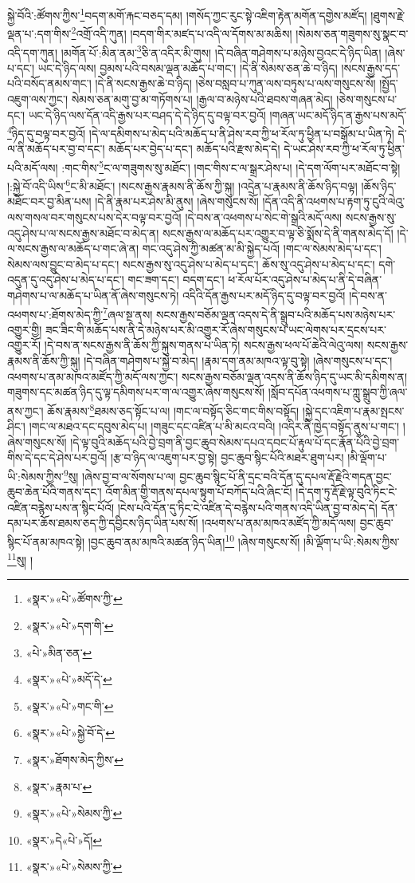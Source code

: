 སྐྱེ་བོའི་:ཚོགས་ཀྱིས་\footnote{«སྣར་»«པེ་»ཚོགས་ཀྱི་}བདག་མགོ་རྐང་བཅད་དམ། །གསོད་ཀྱང་རུང་སྟེ་འཇིག་རྟེན་མགོན་དགྱེས་མཛོད། །ཐུགས་རྗེ་ལྡན་པ་:དག་གིས་\footnote{«སྣར་»«པེ་»དག་གི་}འགྲོ་འདི་ཀུན། །བདག་གིར་མཛད་པ་འདི་ལ་དོགས་མ་མཆིས། །སེམས་ཅན་གཟུགས་སུ་སྣང་བ་འདི་དག་ཀུན། །མགོན་པོ་:མིན་ནམ་\footnote{«པེ་»མིན་ཅན་}ཅི་ན་འདིར་མི་གུས། །དེ་བཞིན་གཤེགས་པ་མཉེས་བྱའང་དེ་ཉིད་ཡིན། །ཞེས་པ་དང་། ཡང་དེ་ཉིད་ལས། བྱམས་པའི་བསམ་ལྡན་མཆོད་པ་གང་། །དེ་ནི་སེམས་ཅན་ཆེ་བ་ཉིད། །སངས་རྒྱས་དད་པའི་བསོད་ནམས་གང་། །དེ་ནི་སངས་རྒྱས་ཆེ་བ་ཉིད། །ཅེས་བསླབ་པ་ཀུན་ལས་བཏུས་པ་ལས་གསུངས་སོ། །སྤྱོད་འཇུག་ལས་ཀྱང་། སེམས་ཅན་མགུ་བྱ་མ་གཏོགས་པ། །རྒྱལ་བ་མཉེས་པའི་ཐབས་གཞན་མེད། །ཅེས་གསུངས་པ་དང་། ཡང་དེ་ཉིད་ལས་དོན་འདི་རྒྱས་པར་བཤད་དེ་དེ་ཉིད་དུ་བལྟ་བར་བྱའོ། །གཞན་ཡང་མདོ་ཉིད་ན་རྒྱས་པས་མདོ་\footnote{«སྣར་»«པེ་»མདོ་དེ་}ཉིད་དུ་བལྟ་བར་བྱའོ། །དེ་ལ་དམིགས་པ་མེད་པའི་མཆོད་པ་ནི་ཤེས་རབ་ཀྱི་ཕ་རོལ་ཏུ་ཕྱིན་པ་བསྒོམ་པ་ཡིན་ཏེ། དེ་ལ་ནི་མཆོད་པར་བྱ་བ་དང་། མཆོད་པར་བྱེད་པ་དང་། མཆོད་པའི་རྫས་མེད་དེ། དེ་ཡང་ཤེས་རབ་ཀྱི་ཕ་རོལ་ཏུ་ཕྱིན་པའི་མདོ་ལས། :གང་གིས་\footnote{«སྣར་»«པེ་»གང་གི་}ང་ལ་གཟུགས་སུ་མཐོང་། །གང་གིས་ང་ལ་སྒྲར་ཤེས་པ། །དེ་དག་ལོག་པར་མཐོང་བ་སྟེ། །:སྐྱེ་བོ་འདི་ཡིས་\footnote{«སྣར་»«པེ་»སྐྱེ་བོ་དེ་}ང་མི་མཐོང་། །སངས་རྒྱས་རྣམས་ནི་ཆོས་ཀྱི་སྐུ། །འདྲེན་པ་རྣམས་ནི་ཆོས་ཉིད་བལྟ། །ཆོས་ཉིད་མཐོང་བར་བྱ་མིན་པས། །དེ་ནི་རྣམ་པར་ཤེས་མི་ནུས། །ཞེས་གསུངས་སོ། །དོན་འདི་ནི་འཕགས་པ་རྟག་ཏུ་ངུའི་ལེའུ་ལས་གསལ་བར་གསུངས་པས་དེར་བལྟ་བར་བྱའོ། །དེ་བས་ན་འཕགས་པ་སེང་གེ་སྒྲའི་མདོ་ལས། སངས་རྒྱས་སུ་འདུ་ཤེས་པ་ལ་སངས་རྒྱས་མཐོང་བ་མེད་ན། སངས་རྒྱས་ལ་མཆོད་པར་འགྱུར་བ་ལྟ་ཅི་སྨོས་དེ་ནི་གནས་མེད་དོ། །དེ་ལ་སངས་རྒྱས་ལ་མཆོད་པ་གང་ཞེ་ན། གང་འདུ་ཤེས་ཀྱི་མཚན་མ་མི་སྐྱེད་པའོ། །གང་ལ་སེམས་མེད་པ་དང་། སེམས་ལས་བྱུང་བ་མེད་པ་དང་། སངས་རྒྱས་སུ་འདུ་ཤེས་པ་མེད་པ་དང་། ཆོས་སུ་འདུ་ཤེས་པ་མེད་པ་དང་། དགེ་འདུན་དུ་འདུ་ཤེས་པ་མེད་པ་དང་། གང་ཟག་དང་། བདག་དང་། ཕ་རོལ་པོར་འདུ་ཤེས་པ་མེད་པ་ནི་དེ་བཞིན་གཤེགས་པ་ལ་མཆོད་པ་ཡིན་ནོ་ཞེས་གསུངས་ཏེ། འདིའི་དོན་རྒྱས་པར་མདོ་ཉིད་དུ་བལྟ་བར་བྱའོ། །དེ་བས་ན་འཕགས་པ་:ཐོགས་མེད་ཀྱི་\footnote{«སྣར་»ཐོགས་མེད་ཀྱིས་}ཞལ་སྔ་ནས། སངས་རྒྱས་བཅོམ་ལྡན་འདས་དེ་ནི་སྒྲུབ་པའི་མཆོད་པས་མཉེས་པར་འགྱུར་གྱི། ཟང་ཟིང་གི་མཆོད་པས་ནི་དེ་མཉེས་པར་མི་འགྱུར་རོ་ཞེས་གསུངས་པ་ཡང་ལེགས་པར་དྲངས་པར་འགྱུར་རོ། །དེ་བས་ན་སངས་རྒྱས་ནི་ཆོས་ཀྱི་སྐུས་གནས་པ་ཡིན་ཏེ། སངས་རྒྱས་ཕལ་པོ་ཆེའི་ལེའུ་ལས། སངས་རྒྱས་རྣམས་ནི་ཆོས་ཀྱི་སྐུ། །དེ་བཞིན་གཤེགས་པ་སྐྱེ་བ་མེད། །རྣམ་དག་ནམ་མཁའ་ལྟ་བུ་སྟེ། །ཞེས་གསུངས་པ་དང་། འཕགས་པ་ནམ་མཁའ་མཛོད་ཀྱི་མདོ་ལས་ཀྱང་། སངས་རྒྱས་བཅོམ་ལྡན་འདས་ནི་ཆོས་ཉིད་དུ་ཡང་མི་དམིགས་ན། གཟུགས་དང་མཚན་ཉིད་དུ་ལྟ་དམིགས་པར་ག་ལ་འགྱུར་ཞེས་གསུངས་སོ། །སློབ་དཔོན་འཕགས་པ་ཀླུ་སྒྲུབ་ཀྱི་ཞལ་ནས་ཀྱང་། ཆོས་རྣམས་\footnote{«སྣར་»རྣམ་པ་}ཐམས་ཅད་སྟོང་པ་ལ། །གང་ལ་བསྟོད་ཅིང་གང་གིས་བསྟོད། །སྐྱེ་དང་འཇིག་པ་རྣམ་སྤངས་ཤིང་། །གང་ལ་མཐའ་དང་དབུས་མེད་པ། །གཟུང་དང་འཛིན་པ་མི་མངའ་བའི། །འདིར་ནི་ཁྱེད་བསྟོད་ནུས་པ་གང་། །ཞེས་གསུངས་སོ། །དེ་ལྟ་བུའི་མཆོད་པའི་བྱེ་བྲག་ནི་བྱང་ཆུབ་སེམས་དཔའ་དབང་པོ་རྟུལ་པོ་དང་རྣོན་པོའི་བྱེ་བྲག་གིས་དེ་དང་དེ་ཤེས་པར་བྱའོ། །རྩ་བ་ཉིད་ལ་འཇུག་པར་བྱ་སྟེ། བྱང་ཆུབ་སྙིང་པོའི་མཐར་ཐུག་པར། །མི་ལྡོག་པ་ཡི་:སེམས་ཀྱིས་\footnote{«སྣར་»«པེ་»སེམས་ཀྱི་}སུ། །ཞེས་བྱ་བ་ལ་སོགས་པ་ལ། བྱང་ཆུབ་སྙིང་པོ་ནི་དྲང་བའི་དོན་དུ་དཔལ་རྡོ་རྗེའི་གདན་བྱང་ཆུབ་ཆེན་པོའི་གནས་དང་། འོག་མིན་གྱི་གནས་དཔལ་སྟུག་པོ་བཀོད་པའི་ཞིང་ངོ། །དེ་དག་ཏུ་རྡོ་རྗེ་ལྟ་བུའི་ཏིང་ངེ་འཛིན་བརྙེས་པས་ན་སྙིང་པོའོ། །ངེས་པའི་དོན་དུ་ཏིང་ངེ་འཛིན་དེ་བརྙེས་པའི་གནས་འདི་ཡིན་བྱ་བ་མེད་དེ། དོན་དམ་པར་ཆོས་ཐམས་ཅད་ཀྱི་དབྱིངས་ཉིད་ཡིན་པས་སོ། །འཕགས་པ་ནམ་མཁའ་མཛོད་ཀྱི་མདོ་ལས། བྱང་ཆུབ་སྙིང་པོ་ནམ་མཁའ་སྟེ། །བྱང་ཆུབ་ནམ་མཁའི་མཚན་ཉིད་ཡིན།\footnote{«སྣར་»དེ«པེ་»དོ།} །ཞེས་གསུངས་སོ། །མི་ལྡོག་པ་ཡི་:སེམས་ཀྱིས་\footnote{«སྣར་»«པེ་»སེམས་ཀྱི་}སུ། །
